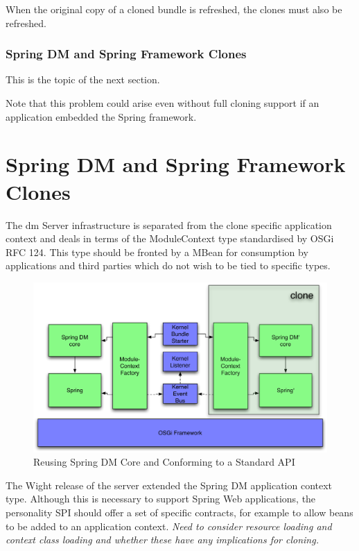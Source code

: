 \documentclass[a4paper,12pt]{article}
\begin{document}
When the original copy of a cloned bundle is refreshed, the clones must also be refreshed.

\subsubsection{Spring DM and Spring Framework Clones}

This is the topic of the next section.

Note that this problem could arise even without full cloning support if an application embedded
the Spring framework.

\clearpage
\section{Spring DM and Spring Framework Clones}

The dm Server infrastructure is separated from the clone specific application context and deals
in terms of the ModuleContext type standardised by OSGi RFC 124. This type should be fronted
by a MBean for consumption by applications and third parties which do not wish to be tied to
specific types.

\begin{figure}[h!]
\includegraphics*[scale=0.2]{cloning-v2.pdf}
\caption{Reusing Spring DM Core and Conforming to a Standard API}
\label{fig:cloningv2}
\end{figure}

The Wight release of the server extended the Spring DM application context type. Although this
is necessary to support Spring Web applications, the personality SPI should offer a set of
specific contracts, for example to allow beans to be added to an application context.
\textit{Need to consider resource loading and context class loading and whether these
have any implications for cloning.}
\end{document}
